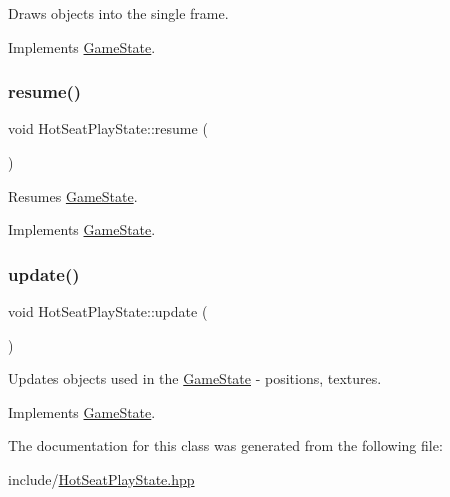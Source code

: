Draws objects into the single frame. 



Implements \mbox{\hyperlink{class_game_state_a0d56cd5355f59a87cf95e1c6d719f329}{Game\+State}}.

\mbox{\label{class_hot_seat_play_state_a7acf9709fdb1527a321730c49783cb50}} 
\subsubsection{\texorpdfstring{resume()}{resume()}}
{\footnotesize\ttfamily void Hot\+Seat\+Play\+State\+::resume (\begin{DoxyParamCaption}{ }\end{DoxyParamCaption})\hspace{0.3cm}{\ttfamily [virtual]}}



Resumes \mbox{\hyperlink{class_game_state}{Game\+State}}. 



Implements \mbox{\hyperlink{class_game_state_a4a421c44f4dae6e9a4fbe10b6e8c47ac}{Game\+State}}.

\mbox{\label{class_hot_seat_play_state_a63baf261e84e10203286fc82082cccdd}} 
\subsubsection{\texorpdfstring{update()}{update()}}
{\footnotesize\ttfamily void Hot\+Seat\+Play\+State\+::update (\begin{DoxyParamCaption}\item[{\mbox{\hyperlink{class_game_engine}{Game\+Engine}} $\ast$}]{ }\end{DoxyParamCaption})\hspace{0.3cm}{\ttfamily [virtual]}}



Updates objects used in the \mbox{\hyperlink{class_game_state}{Game\+State}} -\/ positions, textures. 



Implements \mbox{\hyperlink{class_game_state_a66b11afe355a9479f94aaf76576980bd}{Game\+State}}.



The documentation for this class was generated from the following file\+:\begin{DoxyCompactItemize}
\item 
include/\mbox{\hyperlink{_hot_seat_play_state_8hpp}{Hot\+Seat\+Play\+State.\+hpp}}\end{DoxyCompactItemize}
